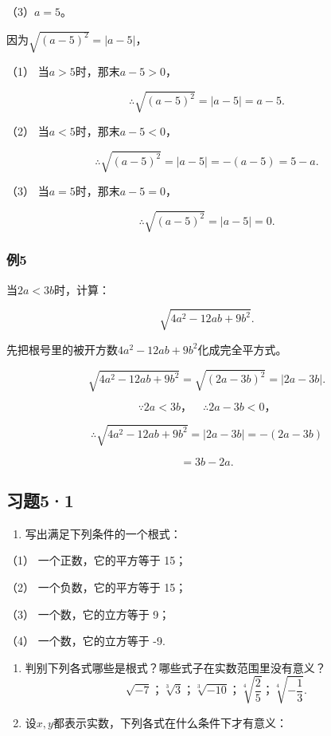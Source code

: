 （3）\(a = 5\)。

 因为\(\sqrt{(a - 5)^2} = |a - 5|\)，

（1） 当\(a > 5\)时，那末\(a - 5 > 0\)，

\[
\therefore \sqrt {(a - 5) ^ {2}} = | a - 5 | = a - 5.
\]

（2） 当\(a < 5\)时，那末\(a - 5 < 0\)，

\[
\therefore \sqrt {(a - 5) ^ {2}} = | a - 5 | = - (a - 5) = 5 - a.
\]

（3） 当\(a = 5\)时，那末\(a - 5 = 0\)，

\[
\therefore \sqrt {(a - 5) ^ {2}} = | a - 5 | = 0.
\]

\subsubsection{例5}

当\(2a < 3b\)时，计算：

\[
\sqrt {4 a ^ {2} - 12 a b + 9 b ^ {2}}.
\]

先把根号里的被开方数\(4a^{2} - 12ab + 9b^{2}\)化成完全平方式。

\[
\sqrt {4 a ^ {2} - 12 a b + 9 b ^ {2}} = \sqrt {(2 a - 3 b) ^ {2}} = | 2 a - 3 b |.
\]

\[
\because 2 a <   3 b\text{，} \quad \therefore 2 a - 3 b <   0\text{，}
\]

\[
\therefore \sqrt {4 a ^ {2} - 12 a b + 9 b ^ {2}} = | 2 a - 3 b | = - (2 a - 3 b)
\]

\[
= 3 b - 2 a.
\]

\subsection{习题5·1}

\begin{enumerate}
\item
  写出满足下列条件的一个根式：
\end{enumerate}

（1） 一个正数，它的平方等于 15；

（2） 一个负数，它的平方等于 15；

（3） 一个数，它的立方等于 9；

（4） 一个数，它的立方等于 -9.

\begin{enumerate}[start=2]
\item
  判别下列各式哪些是根式？哪些式子在实数范围里没有意义？
\[
\sqrt {- 7}\text{；} \sqrt[3]{3}\text{；} \sqrt[3]{- 10}\text{；} \sqrt[4]{\frac{2}{5}}\text{；} \sqrt[4]{- \frac{1}{3}}.
\]
\item
  设\(x, y\)都表示实数，下列各式在什么条件下才有意义：
\end{enumerate}

